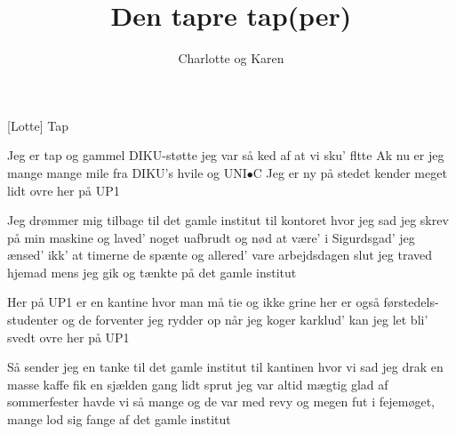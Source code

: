 \documentclass[a4paper,11pt]{article}
\title{Den tapre tap(per)}
\author{Charlotte og Karen}
\begin{document}
\maketitle

\begin{roles}
[Lotte] Tap
\end{roles}


\begin{song}
Jeg er tap og gammel DIKU-støtte
jeg var så ked af
at vi sku' fltte
Ak nu er jeg mange mange mile
fra DIKU's hvile
og UNI$\bullet$C
Jeg er ny på stedet
kender meget lidt
ovre her på UP1

Jeg drømmer mig tilbage til det gamle institut
til kontoret hvor jeg sad
jeg skrev på min maskine
og laved' noget uafbrudt
og nød at være' i Sigurdsgad'
jeg ænsed' ikk' at timerne de spænte
og allered' vare arbejdsdagen slut
jeg traved hjemad mens jeg gik og tænkte
på det gamle institut

Her på UP1 er en kantine
hvor man må tie
og ikke grine
her er også førstedels-studenter
og de forventer
jeg rydder op
når jeg koger karklud'
kan jeg let bli' svedt
ovre her på UP1

Så sender jeg en tanke til det gamle institut
til kantinen hvor vi sad
jeg drak en masse kaffe
fik en sjælden gang lidt sprut
jeg var altid mægtig glad
af sommerfester havde vi så mange
og de var med revy og megen fut
i fejemøget, mange lod sig fange
af det gamle institut
\end{song}
\end{document}
